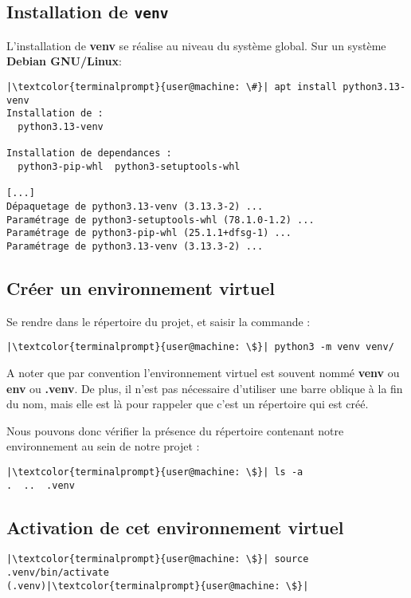 \subsection*{Installation de \texttt{venv}}
L'installation de \textbf{venv} se réalise au niveau du système global. Sur un système \textbf{Debian GNU/Linux}:

\begin{lstlisting}[style=terminal]
|\textcolor{terminalprompt}{user@machine: \#}| apt install python3.13-venv
Installation de :
  python3.13-venv

Installation de dependances :
  python3-pip-whl  python3-setuptools-whl

[...]
Dépaquetage de python3.13-venv (3.13.3-2) ...
Paramétrage de python3-setuptools-whl (78.1.0-1.2) ...
Paramétrage de python3-pip-whl (25.1.1+dfsg-1) ...
Paramétrage de python3.13-venv (3.13.3-2) ...
\end{lstlisting}

\subsection*{Créer un environnement virtuel}
Se rendre dans le répertoire du projet, et saisir la commande :
\begin{lstlisting}[style=terminal]
|\textcolor{terminalprompt}{user@machine: \$}| python3 -m venv venv/
\end{lstlisting}

A noter que par convention l'environnement virtuel est souvent nommé \textbf{venv} ou \textbf{env} ou \textbf{.venv}. De plus, il n'est pas nécessaire d'utiliser une barre oblique à la fin du nom, mais elle est là pour rappeler que c'est un répertoire qui est créé.

Nous pouvons donc vérifier la présence du répertoire contenant notre environnement au sein de notre projet :
\begin{lstlisting}[style=terminal]
|\textcolor{terminalprompt}{user@machine: \$}| ls -a
.  ..  .venv
\end{lstlisting}

\subsection*{Activation de cet environnement virtuel}
\begin{lstlisting}[style=terminal]
|\textcolor{terminalprompt}{user@machine: \$}| source .venv/bin/activate
(.venv)|\textcolor{terminalprompt}{user@machine: \$}|
\end{lstlisting}

